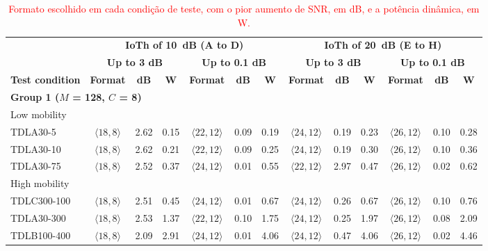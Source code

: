 \begin{table}[htbp]
\caption{\textcolor{red}{Formato escolhido em cada condição de teste, com o pior aumento de SNR, em dB, e a potência dinâmica, em W.}}
\label{tab:escolha-condicao}
\vspace{4pt} %
\centering
\scriptsize
\color{red}
\renewcommand{\arraystretch}{1.2}
\setlength{\tabcolsep}{2.2pt}
\begin{tabular}{lcccccccccccc}
\toprule
 & \multicolumn{6}{c}{\textbf{IoTh of 10~dB (A to D)}} & \multicolumn{6}{c}{\textbf{IoTh of 20~dB (E to H)}} \\
\cmidrule(lr){2-7}\cmidrule(lr){8-13}
 & \multicolumn{3}{c}{\textbf{Up to 3 dB}} & \multicolumn{3}{c}{\textbf{Up to 0.1 dB}} & \multicolumn{3}{c}{\textbf{Up to 3 dB}} & \multicolumn{3}{c}{\textbf{Up to 0.1 dB}} \\
\cmidrule(lr){2-4}\cmidrule(lr){5-7}\cmidrule(lr){8-10}\cmidrule(lr){11-13}
\textbf{Test condition} & \textbf{Format} & \textbf{dB} & \textbf{W} & \textbf{Format} & \textbf{dB} & \textbf{W} & \textbf{Format} & \textbf{dB} & \textbf{W} & \textbf{Format} & \textbf{dB} & \textbf{W} \\
\midrule
\multicolumn{13}{l}{\textbf{Group 1 ($M$ = 128, $C$ = 8)}} \\
\multicolumn{13}{l}{Low mobility} \\
\quad TDLA30-5 & $\langle 18,8\rangle$ & 2.62 & 0.15 & $\langle 22,12\rangle$ & 0.09 & 0.19 & $\langle 24,12\rangle$ & 0.19 & 0.23 & $\langle 26,12\rangle$ & 0.10 & 0.28 \\
\quad TDLA30-10 & $\langle 18,8\rangle$ & 2.62 & 0.21 & $\langle 22,12\rangle$ & 0.09 & 0.25 & $\langle 24,12\rangle$ & 0.19 & 0.30 & $\langle 26,12\rangle$ & 0.10 & 0.36 \\
\quad TDLA30-75 & $\langle 18,8\rangle$ & 2.52 & 0.37 & $\langle 24,12\rangle$ & 0.01 & 0.55 & $\langle 22,12\rangle$ & 2.97 & 0.47 & $\langle 26,12\rangle$ & 0.02 & 0.62 \\
\multicolumn{13}{l}{High mobility} \\
\quad TDLC300-100 & $\langle 18,8\rangle$ & 2.51 & 0.45 & $\langle 24,12\rangle$ & 0.01 & 0.67 & $\langle 24,12\rangle$ & 0.26 & 0.67 & $\langle 26,12\rangle$ & 0.10 & 0.76 \\
\quad TDLA30-300 & $\langle 18,8\rangle$ & 2.53 & 1.37 & $\langle 22,12\rangle$ & 0.10 & 1.75 & $\langle 24,12\rangle$ & 0.25 & 1.97 & $\langle 26,12\rangle$ & 0.08 & 2.09 \\
\quad TDLB100-400 & $\langle 18,8\rangle$ & 2.09 & 2.91 & $\langle 24,12\rangle$ & 0.01 & 4.06 & $\langle 24,12\rangle$ & 0.47 & 4.06 & $\langle 26,12\rangle$ & 0.02 & 4.46 \\

\end{tabular}
\end{table}
